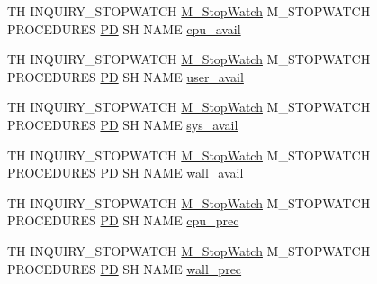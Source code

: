 \begin{DoxyCompactItemize}
\item 
TH I\+N\+Q\+U\+I\+R\+Y\+\_\+\+S\+T\+O\+P\+W\+A\+T\+CH \hyperlink{option__stopwatch_83_8txt_aa2011fc45a5e502e87ee50996a8a9305}{M\+\_\+\+Stop\+Watch} M\+\_\+\+S\+T\+O\+P\+W\+A\+T\+CH P\+R\+O\+C\+E\+D\+U\+R\+ES \hyperlink{what__overview_81_8txt_a85f26da5a4481fbdb0d9c79f2b94de3e}{PD} SH N\+A\+ME \hyperlink{inquiry__stopwatch_83_8txt_a7abc42d907bf857b7ccd85e08a2698bf}{cpu\+\_\+avail}
\item 
TH I\+N\+Q\+U\+I\+R\+Y\+\_\+\+S\+T\+O\+P\+W\+A\+T\+CH \hyperlink{option__stopwatch_83_8txt_aa2011fc45a5e502e87ee50996a8a9305}{M\+\_\+\+Stop\+Watch} M\+\_\+\+S\+T\+O\+P\+W\+A\+T\+CH P\+R\+O\+C\+E\+D\+U\+R\+ES \hyperlink{what__overview_81_8txt_a85f26da5a4481fbdb0d9c79f2b94de3e}{PD} SH N\+A\+ME \hyperlink{inquiry__stopwatch_83_8txt_a302378a0fc3cc389357199927dccdc6d}{user\+\_\+avail}
\item 
TH I\+N\+Q\+U\+I\+R\+Y\+\_\+\+S\+T\+O\+P\+W\+A\+T\+CH \hyperlink{option__stopwatch_83_8txt_aa2011fc45a5e502e87ee50996a8a9305}{M\+\_\+\+Stop\+Watch} M\+\_\+\+S\+T\+O\+P\+W\+A\+T\+CH P\+R\+O\+C\+E\+D\+U\+R\+ES \hyperlink{what__overview_81_8txt_a85f26da5a4481fbdb0d9c79f2b94de3e}{PD} SH N\+A\+ME \hyperlink{inquiry__stopwatch_83_8txt_a1f4290ad6f2e60e1f902db8a5e86ba7b}{sys\+\_\+avail}
\item 
TH I\+N\+Q\+U\+I\+R\+Y\+\_\+\+S\+T\+O\+P\+W\+A\+T\+CH \hyperlink{option__stopwatch_83_8txt_aa2011fc45a5e502e87ee50996a8a9305}{M\+\_\+\+Stop\+Watch} M\+\_\+\+S\+T\+O\+P\+W\+A\+T\+CH P\+R\+O\+C\+E\+D\+U\+R\+ES \hyperlink{what__overview_81_8txt_a85f26da5a4481fbdb0d9c79f2b94de3e}{PD} SH N\+A\+ME \hyperlink{inquiry__stopwatch_83_8txt_a73da37f4d5799996a833d139d422cef8}{wall\+\_\+avail}
\item 
TH I\+N\+Q\+U\+I\+R\+Y\+\_\+\+S\+T\+O\+P\+W\+A\+T\+CH \hyperlink{option__stopwatch_83_8txt_aa2011fc45a5e502e87ee50996a8a9305}{M\+\_\+\+Stop\+Watch} M\+\_\+\+S\+T\+O\+P\+W\+A\+T\+CH P\+R\+O\+C\+E\+D\+U\+R\+ES \hyperlink{what__overview_81_8txt_a85f26da5a4481fbdb0d9c79f2b94de3e}{PD} SH N\+A\+ME \hyperlink{inquiry__stopwatch_83_8txt_a31483d611b443f67111f1154cd00fc7e}{cpu\+\_\+prec}
\item 
TH I\+N\+Q\+U\+I\+R\+Y\+\_\+\+S\+T\+O\+P\+W\+A\+T\+CH \hyperlink{option__stopwatch_83_8txt_aa2011fc45a5e502e87ee50996a8a9305}{M\+\_\+\+Stop\+Watch} M\+\_\+\+S\+T\+O\+P\+W\+A\+T\+CH P\+R\+O\+C\+E\+D\+U\+R\+ES \hyperlink{what__overview_81_8txt_a85f26da5a4481fbdb0d9c79f2b94de3e}{PD} SH N\+A\+ME \hyperlink{inquiry__stopwatch_83_8txt_a5ff5c1fe3dd4df4b4c88053f0182e09d}{wall\+\_\+prec}
\item 

\end{DoxyCompactItemize}
